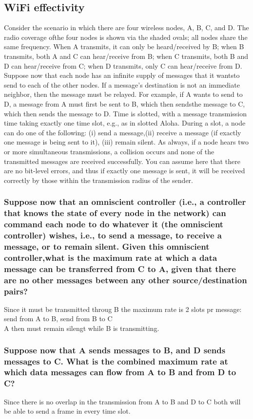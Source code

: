 \documentclass[12pt, a4paper]{article}
\begin{document}
		\subsection{WiFi effectivity}
			Consider the scenario in which there are four wireless nodes, A, B, C, and D. The radio coverage ofthe four nodes is shown via the shaded ovals; all nodes share the same frequency. When A transmits, it can only be heard/received by B; when B transmits, both A and C can hear/receive from B; when C transmits, both B and D can hear/receive from C; when D transmits, only C can hear/receive from D. Suppose now that each node has an infinite supply of messages that it wantsto send to each of the other nodes. If a message’s destination is not an immediate neighbor, then the message must be relayed. For example, if A wants to send to D, a message from A must first be sent to B, which then sendsthe message to C, which then sends the message to D. Time is slotted, with a message transmission time taking exactly one time slot, e.g., as in slotted Aloha. During a slot, a node can do one of the following: (i) send a message,(ii) receive a message (if exactly one message is being sent to it), (iii) remain silent. As always, if a node hears two or more simultaneous transmissions, a collision occurs and none of the transmitted messages are received successfully. You can assume here that there are no bit-level errors, and thus if exactly one message is sent, it will be received correctly by those within the transmission radius of the sender.\\
			\subsubsection{Suppose now that an omniscient controller (i.e., a controller that knows the state of every node in the network) can command each node to do whatever it (the omniscient controller) wishes, i.e., to send a message, to receive a message, or to remain silent. Given this omniscient controller,what is the maximum rate at which a data message can be transferred from C to A, given that there are no other messages between any other source/destination pairs?}
				Since it must be transmitted throug B the maximum rate is 2 slots pr message: send from A to B, send from B to C\\
				A then must remain silengt while B is transmitting.
			\subsubsection{Suppose now that A sends messages to B, and D sends messages to C. What is the combined maximum rate at which data messages can flow from A to B and from D to C?}
				Since there is no overlap in the transmission from A to B and D to C both will be able to send a frame in every time slot.
\end{document}
